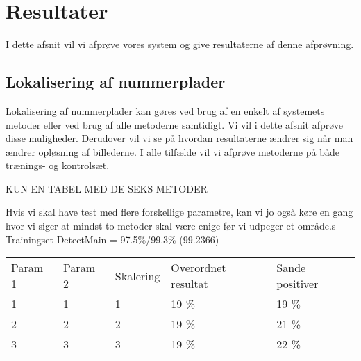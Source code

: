 \section{Resultater}
\label{sec:resultater}

I dette afsnit vil vi afprøve vores system og give resultaterne af denne afprøvning.






\subsection{Lokalisering af nummerplader}
Lokalisering af nummerplader kan gøres ved brug af en enkelt af systemets metoder eller ved brug af alle metoderne samtidigt. Vi vil i dette afsnit afprøve disse muligheder. Derudover vil vi se på hvordan resultaterne ændrer sig når man ændrer opløsning af billederne. I alle tilfælde vil vi afprøve metoderne på både trænings- og kontrolsæt. 

KUN EN TABEL MED DE SEKS METODER

Hvis vi skal have test med flere forskellige parametre, kan vi jo også køre en gang hvor vi siger at mindst to metoder skal være enige før vi udpeger et område.s
Trainingset
DetectMain = 97.5\%/99.3\% (99.2366)
\begin{tabular}{|l|l|l|l|l|}
\hline
\rowcolor[gray]{0.9} \multicolumn{5}{|>{\columncolor[gray]{0.9}}c|}{\textbf{Træningssæt}} \\ \hline
Param 1 & Param 2 & Skalering & Overordnet resultat & Sande positiver\\ \hline
1 & 1 & 1 & 19 \% & 19 \%\\ \hline
2 & 2 & 2 & 19 \% & 21 \% \\ \hline
3 & 3 & 3 & 19 \% & 22 \% \\
\hline
\end{tabular}

